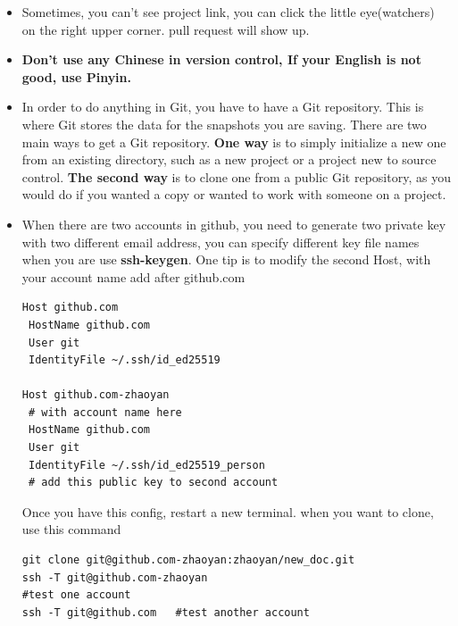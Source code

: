 \documentclass[a4paper,11pt,twoside]{book}
\begin{document}
\begin{itemize}
    \item Sometimes, you can't see project link, you can click the little eye(watchers) on the right upper corner. pull request will show up.

\item \textbf{Don't use any Chinese in version control, If your English is not good, use Pinyin.}
    
\item In order to do anything in Git, you have to have a Git repository. This is where Git stores the data for the snapshots you are saving. There are two main ways to get a Git repository. \textbf{One way} is to simply initialize a new one from an existing directory, such as a new project or a project new to source control. \textbf{The second way} is to clone one from a public Git repository, as you would do if you wanted a copy or wanted to work with someone on a project.

\item When there are two accounts in github, you need to generate two private key with two different email address, you can specify different key file names when you are use \textbf{ssh-keygen}. One tip is to modify the second Host, with your account name add after github.com
\begin{verbatim}
Host github.com
 HostName github.com
 User git
 IdentityFile ~/.ssh/id_ed25519

Host github.com-zhaoyan
 # with account name here
 HostName github.com
 User git
 IdentityFile ~/.ssh/id_ed25519_person 
 # add this public key to second account
\end{verbatim}
Once you have this config, restart a new terminal. when you want to clone, use this command
\begin{verbatim}
git clone git@github.com-zhaoyan:zhaoyan/new_doc.git
ssh -T git@github.com-zhaoyan
#test one account
ssh -T git@github.com   #test another account
\end{verbatim}



\end{itemize}
\end{document}

